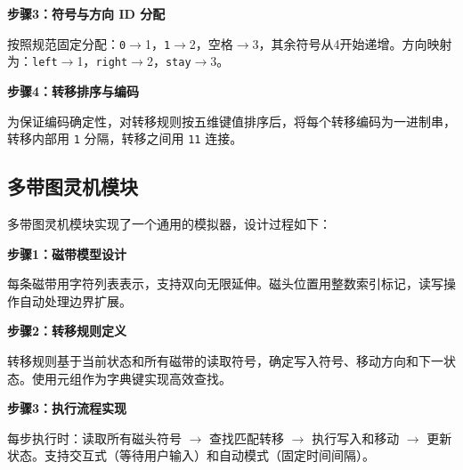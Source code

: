 \documentclass{sysucseexp}
\begin{document}
\textbf{步骤3：符号与方向 ID 分配}

按照规范固定分配：\texttt{0}$\rightarrow$1，\texttt{1}$\rightarrow$2，空格$\rightarrow$3，其余符号从4开始递增。方向映射为：\texttt{left}$\rightarrow$1，\texttt{right}$\rightarrow$2，\texttt{stay}$\rightarrow$3。

\textbf{步骤4：转移排序与编码}

为保证编码确定性，对转移规则按五维键值排序后，将每个转移编码为一进制串，转移内部用 \texttt{1} 分隔，转移之间用 \texttt{11} 连接。


\subsection{多带图灵机模块}

多带图灵机模块实现了一个通用的模拟器，设计过程如下：

\textbf{步骤1：磁带模型设计}

每条磁带用字符列表表示，支持双向无限延伸。磁头位置用整数索引标记，读写操作自动处理边界扩展。

\textbf{步骤2：转移规则定义}

转移规则基于当前状态和所有磁带的读取符号，确定写入符号、移动方向和下一状态。使用元组作为字典键实现高效查找。

\textbf{步骤3：执行流程实现}

每步执行时：读取所有磁头符号 $\rightarrow$ 查找匹配转移 $\rightarrow$ 执行写入和移动 $\rightarrow$ 更新状态。支持交互式（等待用户输入）和自动模式（固定时间间隔）。

\end{document}
